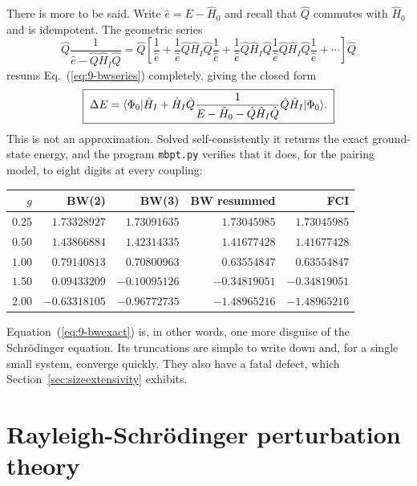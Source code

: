 There is more to be said.  Write $\hat{e}=E-\hat{H}_0$ and recall that
$\hat{Q}$ commutes with $\hat{H}_0$ and is idempotent.  The geometric series
\begin{equation}
  \hat{Q}\frac{1}{\hat{e}-\hat{Q}\hat{H}_I\hat{Q}}
   = \hat{Q}\left[\frac{1}{\hat{e}}
     + \frac{1}{\hat{e}}\hat{Q}\hat{H}_I\hat{Q}\frac{1}{\hat{e}}
     + \frac{1}{\hat{e}}\hat{Q}\hat{H}_I\hat{Q}\frac{1}{\hat{e}}
       \hat{Q}\hat{H}_I\hat{Q}\frac{1}{\hat{e}}
     + \cdots\right]\hat{Q}
  \label{eq:9-geometric}
\end{equation}
resums Eq.~(\ref{eq:9-bwseries}) completely, giving the closed form
\begin{equation}
  \boxed{\;
  \Delta E = \langle \Phi_0 | \hat{H}_I
    + \hat{H}_I\hat{Q}
      \frac{1}{E-\hat{H}_0-\hat{Q}\hat{H}_I\hat{Q}}
      \hat{Q}\hat{H}_I | \Phi_0 \rangle.
  \;}
  \label{eq:9-bwexact}
\end{equation}
This is not an approximation.  Solved self-consistently it returns the exact
ground-state energy, and the program \texttt{mbpt.py} verifies that it does,
for the pairing model, to eight digits at every coupling:

\begin{center}
\renewcommand{\arraystretch}{1.2}
\setlength{\tabcolsep}{11pt}
\begin{tabular}{rrrrr}
\toprule
$g$ & BW(2) & BW(3) & BW resummed & FCI\\
\midrule
$0.25$ & $1.73328927$ & $1.73091635$ & $1.73045985$ & $1.73045985$\\
$0.50$ & $1.43866884$ & $1.42314335$ & $1.41677428$ & $1.41677428$\\
$1.00$ & $0.79140813$ & $0.70800963$ & $0.63554847$ & $0.63554847$\\
$1.50$ & $0.09433209$ & $-0.10095126$ & $-0.34819051$ & $-0.34819051$\\
$2.00$ & $-0.63318105$ & $-0.96772735$ & $-1.48965216$ & $-1.48965216$\\
\bottomrule
\end{tabular}
\end{center}

Equation~(\ref{eq:9-bwexact}) is, in other words, one more disguise of the
Schr\"odinger equation.  Its truncations are simple to write down and, for a
single small system, converge quickly.  They also have a fatal defect, which
Section~\ref{sec:sizeextensivity} exhibits.

\section{Rayleigh-Schr\"odinger perturbation theory}
\label{sec:rayleighschrodinger}

